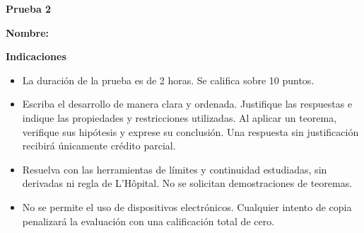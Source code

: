 \documentclass[10pt,a5paper]{article}
\begin{document}
\begin{center}
  {\color{Azul}\large\bfseries Prueba 2}
\end{center}

\noindent\textbf{Nombre:} \hrulefill

\medskip
\noindent\textbf{Indicaciones}
\begin{itemize}
  \item La duración de la prueba es de 2 horas. Se califica sobre 10 puntos.
  \item Escriba el desarrollo de manera clara y ordenada. Justifique las respuestas e indique las propiedades y restricciones utilizadas. Al aplicar un teorema, verifique sus hipótesis y exprese su conclusión. Una respuesta sin justificación recibirá únicamente crédito parcial.
  \item Resuelva con las herramientas de límites y continuidad estudiadas, sin derivadas ni regla de L'Hôpital. No se solicitan demostraciones de teoremas.
  \item No se permite el uso de dispositivos electrónicos. Cualquier intento de copia penalizará la evaluación con una calificación total de cero.
\end{itemize}
\end{document}

